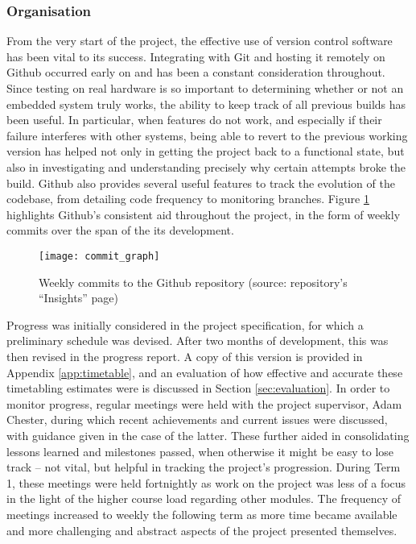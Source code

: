     \subsubsection{Organisation}
        From the very start of the project, the effective use of version control
        software has been vital to its success. Integrating with Git and hosting
        it remotely on Github occurred early on and has been a constant
        consideration throughout. Since testing on real hardware is so important
        to determining whether or not an embedded system truly works, the
        ability to keep track of all previous builds has been useful.  In
        particular, when features do not work, and especially if their failure
        interferes with other systems, being able to revert to the previous
        working version has helped not only in getting the project back to a
        functional state, but also in investigating and understanding precisely
        why certain attempts broke the build. Github also provides several
        useful features to track the evolution of the codebase, from detailing
        code frequency to monitoring branches. Figure \ref{fig:commits}
        highlights Github's consistent aid throughout the project, in the form
        of weekly commits over the span of the its development.

        \begin{figure}[h]
            \centering
            \texttt{[image: commit\_graph]}
            \caption{Weekly commits to the Github repository (source:
            repository's ``Insights'' page)}
            \label{fig:commits}
        \end{figure}

        Progress was initially considered in the project specification, for
        which a preliminary schedule was devised. After two months of
        development, this was then revised in the progress report.  A copy of
        this version is provided in Appendix \ref{app:timetable}, and an
        evaluation of how effective and accurate these timetabling estimates
        were is discussed in Section \ref{sec:evaluation}. In order to monitor
        progress, regular meetings were held with the project supervisor, Adam
        Chester, during which recent achievements and current issues were
        discussed, with guidance given in the case of the latter. These further
        aided in consolidating lessons learned and milestones passed, when
        otherwise it might be easy to lose track -- not vital, but helpful in
        tracking the project's progression. During Term 1, these meetings were
        held fortnightly as work on the project was less of a focus in the light
        of the higher course load regarding other modules. The frequency of
        meetings increased to weekly the following term as more time became
        available and more challenging and abstract aspects of the project
        presented themselves.

